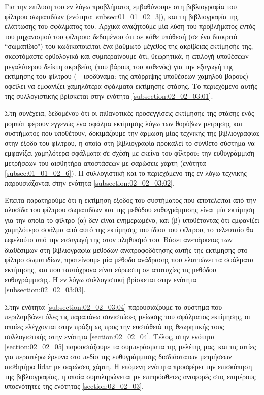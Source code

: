 Για την επίλυση του εν λόγω προβλήματος εμβαθύνουμε στη βιβλιογραφία του
φίλτρου σωματιδίων (ενότητα \ref{subsec:01_01_02_3}), και τη βιβλιογραφία της
ελάττωσης του σφάλματος του. Αρχικά αναζητούμε μία λύση του προβλήματος εντός
του μηχανισμού του φίλτρου: δεδομένου ότι σε κάθε υπόθεσή (σε ένα διακριτό
``σωματίδιο") του κωδικοποιείται ένα βαθμωτό μέγεθος της ακρίβειας εκτίμησής
της, σκεφτόμαστε ορθολογικά και συμπεραίνουμε ότι, θεωρητικά, η επιλογή
υποθέσεων μεγαλύτερου δείκτη ακριβείας (του βάρους του καθενός) για την εξαγωγή
της εκτίμησης του φίλτρου (---ισοδύναμα: της απόρριψης υποθέσεων χαμηλού βάρους)
οφείλει να εμφανίζει χαμηλότερα σφάλματα εκτίμησης στάσης. Το περιεχόμενο αυτής
της συλλογιστικής βρίσκεται στην ενότητα \ref{subsection:02_02_03:01}.

Στη συνέχεια, δεδομένου ότι οι πιθανοτικές προσεγγίσεις εκτίμησης της στάσης
ενός ρομπότ φέρουν εγγενώς ένα σφάλμα εκτίμησης λόγω των θορύβων μέτρησης και
συστήματος που υποθέτουν, δοκιμάζουμε την άρμωση μίας τεχνικής της
βιβλιογραφίας στην έξοδο του φίλτρου, η οποία στη βιβλιογραφία προκαλεί το
σύνθετο σύστημα να εμφανίζει χαμηλότερα σφάλματα σε σχέση με εκείνα του
φίλτρου: την ευθυγράμμιση μετρήσεων του αισθητήρα αποστάσεων με σαρώσεις χάρτη
(ενότητα \ref{subsec:01_01_02_6}). Η συλλογιστική και το περιεχόμενο της εν
λόγω τεχνικής παρουσιάζονται στην ενότητα \ref{subsection:02_02_03:02}.

Έπειτα παρατηρούμε ότι η εκτίμηση-έξοδος του συστήματος που αποτελείται από την
αλυσίδα του φίλτρου σωματιδίων και της μεθόδου ευθυγράμμισης είναι μία εκτίμηση
για την οποία το φίλτρο (α) δεν είναι ενημερωμένο, και (β) υποθέτοντας ότι
εμφανίζει χαμηλότερο σφάλμα από αυτό της εκτίμησης του ίδιου του φίλτρου, το
τελευταίο θα ωφελούτο από την εισαγωγή της στον πληθυσμό του. Βάσει ανεπάρκειας
των διαθέσιμων στη βιβλιογραφία μεθόδων ανατροφοδότησης αυτής της εκτίμησης στο
φίλτρο σωματιδίων, προτείνουμε μία μέθοδο ανάδρασης που ελαττώνει τα σφάλματα
εκτίμησης, και που ταυτόχρονα είναι εύρωστη σε αποτυχίες τις μεθόδου
ευθυγράμμισης.  Η εν λόγω συλλογιστική βρίσκεται στην ενότητα
\ref{subsection:02_02_03:03}.

Στην ενότητα \ref{subsection:02_02_03:04} παρουσιάζουμε το σύστημα που
περιλαμβάνει όλες τις παραπάνω συνιστώσες μείωσης του σφάλματος εκτίμησης, οι
οποίες ελέγχονται στην πράξη ως προς την ευστάθειά της θεωρητικής τους
συλλογιστικής στην ενότητα \ref{section:02_02_04}. Τέλος, στην ενότητα
\ref{section:02_02_05} παρουσιάζουμε τα συμπεράσματα της μελέτης μας, και τις
αιτίες για περαιτέρω έρευνα στο πεδίο της ευθυγράμμισης δισδιάστατων μετρήσεων
αισθητήρα lidar με σαρώσεις χάρτη. Η επόμενη ενότητα προσφέρει την επισκόπηση
της βιβλιογραφίας, η οποία συμπληρώνεται με επιπρόσθετες αναφορές στις
επιμέρους υποενότητες της ενότητας \ref{section:02_02_03}.
